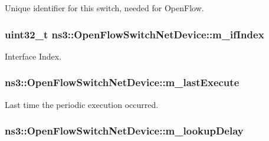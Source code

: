 Unique identifier for this switch, needed for Open\+Flow. 

\subsubsection[{\texorpdfstring{m\+\_\+if\+Index}{m_ifIndex}}]{\setlength{\rightskip}{0pt plus 5cm}uint32\+\_\+t ns3\+::\+Open\+Flow\+Switch\+Net\+Device\+::m\+\_\+if\+Index\hspace{0.3cm}{\ttfamily [private]}}\hypertarget{classns3_1_1OpenFlowSwitchNetDevice_ad8be8954209401de3b29c6e4da106b89}{}\label{classns3_1_1OpenFlowSwitchNetDevice_ad8be8954209401de3b29c6e4da106b89}


Interface Index. 

\subsubsection[{\texorpdfstring{m\+\_\+last\+Execute}{m_lastExecute}}]{ ns3\+::\+Open\+Flow\+Switch\+Net\+Device\+::m\+\_\+last\+Execute\hspace{0.3cm}{\ttfamily [private]}}\hypertarget{classns3_1_1OpenFlowSwitchNetDevice_a53db2fcee324af42c9d7364c76708423}{}\label{classns3_1_1OpenFlowSwitchNetDevice_a53db2fcee324af42c9d7364c76708423}


Last time the periodic execution occurred. 

\subsubsection[{\texorpdfstring{m\+\_\+lookup\+Delay}{m_lookupDelay}}]{ ns3\+::\+Open\+Flow\+Switch\+Net\+Device\+::m\+\_\+lookup\+Delay\hspace{0.3cm}{\ttfamily [private]}}\hypertarget{classns3_1_1OpenFlowSwitchNetDevice_aa408b593e982502e0939dba57aa4c907}{}\label{classns3_1_1OpenFlowSwitchNetDevice_aa408b593e982502e0939dba57aa4c907}


